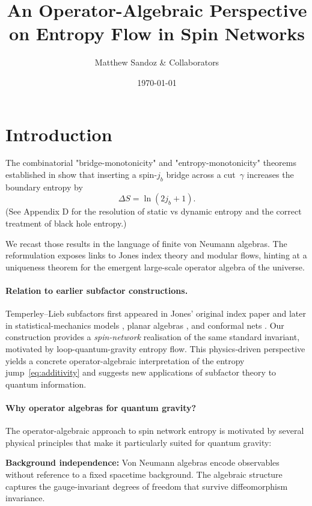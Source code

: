 \documentclass[11pt]{article}
\begin{document}
\title{An Operator-Algebraic Perspective on Entropy Flow in Spin Networks}
\author{\small Matthew Sandoz \& Collaborators}
\date{\today}
\maketitle

\section{Introduction}
The combinatorial "bridge-monotonicity" and "entropy-monotonicity" theorems
established in \cite{BridgeMono,EntropyMono}
show that inserting a spin-$j_b$ bridge across a cut~$\gamma$ increases the
boundary entropy by
\[
  \Delta S = \ln(2j_b+1).
\]
(See Appendix D for the resolution of static vs dynamic entropy and the correct treatment of black hole entropy.)

We recast those results in the language of finite von Neumann algebras.
The reformulation exposes links to Jones index theory and modular flows, hinting
at a uniqueness theorem for the emergent large-scale operator algebra of the
universe.

\paragraph{Relation to earlier subfactor constructions.}
Temperley--Lieb subfactors first appeared in Jones’ original index
paper \cite{Jones1983} and later in statistical-mechanics models
\cite{KauffmanLins}, planar algebras \cite{JonesPA}, and conformal nets
\cite{KawahigashiLongo}.
Our construction provides a \emph{spin-network} realisation of the same
standard invariant, motivated by loop-quantum-gravity entropy flow.
This physics‐driven perspective yields a concrete operator-algebraic
interpretation of the entropy jump~\eqref{eq:additivity} and suggests
new applications of subfactor theory to quantum information.

\paragraph{Why operator algebras for quantum gravity?}
The operator-algebraic approach to spin network entropy is motivated by several
physical principles that make it particularly suited for quantum gravity:

\textbf{Background independence:} Von Neumann algebras encode observables without
reference to a fixed spacetime background. The algebraic structure captures the
gauge-invariant degrees of freedom that survive diffeomorphism invariance.
\end{document}
